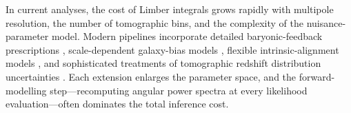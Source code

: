 In current analyses, the cost of Limber integrals grows rapidly with multipole resolution, the number of tomographic bins, and the complexity of the nuisance-parameter model. Modern pipelines incorporate detailed baryonic-feedback prescriptions \citep[e.g.][]{2019OJAp....2E...4C, 2020MNRAS.495.4800A, 2021MNRAS.502.1401M, 2021JCAP...12..046G, 2025MNRAS.539.1337S}, scale-dependent galaxy-bias models \citep[e.g.][]{2018PhR...733....1D, 2020MNRAS.492.5754M, 2021MNRAS.505.1422K}, flexible intrinsic-alignment models \citep[e.g.][]{2013MNRAS.431..477J, 2013MNRAS.436..819J, 2015PhR...558....1T, 2019PhRvD.100j3506B, 2021MNRAS.501.2983F, 2024OJAp....7E..45V}, and sophisticated treatments of tomographic redshift distribution uncertainties \citep[e.g.][]{2020JCAP...10..056H, 2021A&A...650A.148S, 2022MNRAS.511.2170C, 2023MNRAS.522.5037R, 2023OJAp....6E..23H, 2025arXiv250600758B}. Each extension enlarges the parameter space, and the forward-modelling step---recomputing angular power spectra at every likelihood evaluation---often dominates the total inference cost.

